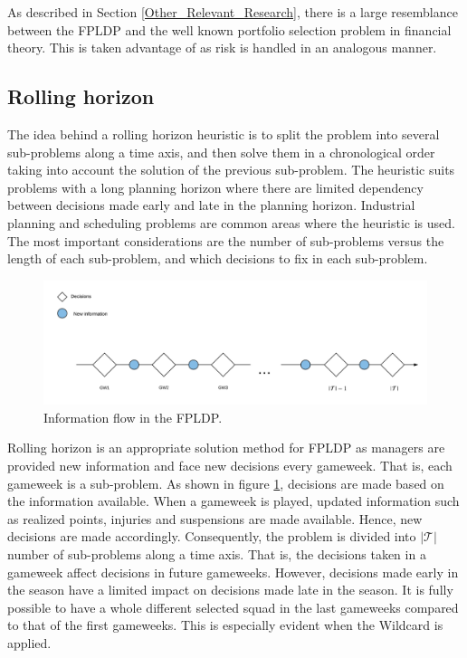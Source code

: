 \newpar

As described in Section \ref{Other_Relevant_Research}, there is a large resemblance between the FPLDP and the well known portfolio selection problem in financial theory. This is taken advantage of as risk is handled in an analogous manner.


\subsection{Rolling horizon}

The idea behind a rolling horizon heuristic is to split the problem into several sub-problems along a time axis, and then solve them in a chronological order taking into account the solution of the previous sub-problem. The heuristic suits problems with a long planning horizon where there are limited dependency between decisions made early and late in the planning horizon. Industrial planning and scheduling problems are common areas where the heuristic is used. The most important considerations are the number of sub-problems versus the length of each sub-problem, and which decisions to fix in each sub-problem. 

\begin{figure}[H]
    \centering
    \includegraphics[scale = 0.47]{fig/chapter_5/Rolling_Horizon_Information_Flow.png}
    \caption{Information flow in the FPLDP.}
    \label{fig:information_flow}
\end{figure}

Rolling horizon is an appropriate solution method for FPLDP as managers are provided new information and face new decisions every gameweek. That is, each gameweek is a sub-problem. As shown in figure \ref{fig:information_flow}, decisions are made based on the information available. When a gameweek is played, updated information such as realized points, injuries and suspensions are made available. Hence, new decisions are made accordingly. Consequently, the problem is divided into $\mathcal{|T|}$ number of sub-problems along a time axis. That is, the decisions taken in a gameweek affect decisions in future gameweeks. However, decisions made early in the season have a limited impact on decisions made late in the season. It is fully possible to have a whole different selected squad in the last gameweeks compared to that of the first gameweeks. This is especially evident when the Wildcard is applied.


